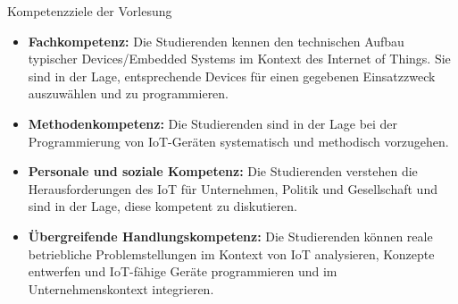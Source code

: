 \begin{frame}{Kompetenzziele der Vorlesung}
    \begin{itemize}
        \item \textbf{Fachkompetenz:} Die Studierenden kennen den
        \textcolor{NavyBlue}{technischen Aufbau typischer Devices/Embedded Systems}
        im Kontext des Internet of Things. Sie sind in der Lage, entsprechende Devices
        für einen gegebenen Einsatzzweck auszuwählen und zu programmieren.
        \medskip

        \item \textbf{Methodenkompetenz:} Die Studierenden sind in der Lage
        bei der Programmierung von IoT-Geräten systematisch und methodisch vorzugehen.
        \medskip

        \item \textbf{Personale und soziale Kompetenz:} Die Studierenden verstehen die Herausforderungen
        des IoT für Unternehmen, Politik und Gesellschaft und sind in der Lage, diese kompetent zu diskutieren.
        \medskip

        \item \textbf{Übergreifende Handlungskompetenz:} Die Studierenden können reale betriebliche
        Problemstellungen im Kontext von IoT analysieren, \textcolor{NavyBlue}{Konzepte entwerfen}
        und \textcolor{NavyBlue}{IoT-fähige Geräte programmieren} und im Unternehmenskontext integrieren.
        \medskip
    \end{itemize}
\end{frame}

